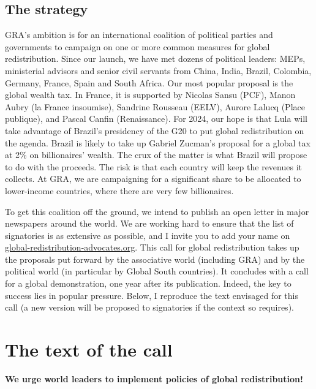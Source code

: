 \documentclass[a5paper,english,openany]{memoir}
\begin{document}
\subsection{The strategy}

GRA's ambition is for an international coalition of political parties and governments to campaign on one or more %
common measures for global redistribution. Since our launch, we have met dozens of political leaders: MEPs, ministerial advisors and senior civil servants %
from China, India, Brazil, Colombia, Germany, France, Spain and South Africa. Our most popular proposal is the global wealth tax. In France, it is supported by Nicolas Sansu (PCF), Manon Aubry (la France insoumise), Sandrine Rousseau (EELV), Aurore Lalucq (Place publique), and Pascal Canfin (Renaissance). %
For 2024, our hope is that Lula will take advantage of Brazil's presidency of the G20 to put global redistribution on the agenda. Brazil is likely to take up Gabriel Zucman's proposal for a global tax at 2\% on billionaires' wealth. The crux of the matter is what Brazil will propose to do with the proceeds. The risk is that each country will keep the revenues it collects. At GRA, we are campaigning for a significant share to be allocated to lower-income countries, where there are very few billionaires.

To get this coalition off the ground, we intend to publish an open letter in major newspapers around the world. We are working hard to ensure that the list of signatories is as extensive as possible, %
and I invite you to add your name on \href{https://global-redistribution-advocates.org/fr/signer-les-petitions}{global-redistribution-advocates.org}. This call for global redistribution takes up the proposals put forward by the associative world (including GRA) and by the political world (in particular by Global South countries). It concludes with a call for a global demonstration, one year after its publication. Indeed, the key to success lies in popular pressure. Below, I reproduce the text envisaged for this call (a new version will be proposed to signatories if the context so requires).%

\section{The text of the call}

\begin{center}
\textbf{We urge world leaders to implement policies of global redistribution!}
\end{center}
\end{document}

